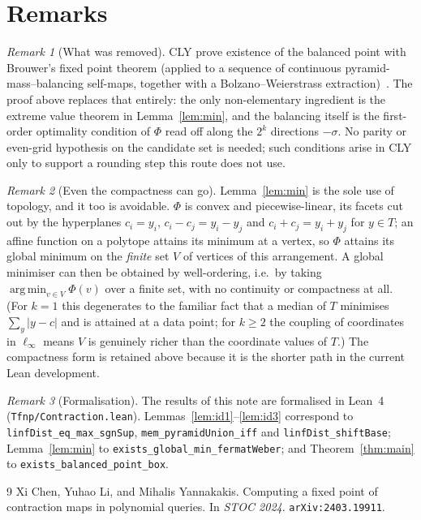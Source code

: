 \documentclass[11pt]{article}
\theoremstyle{plain}
\theoremstyle{definition}
\theoremstyle{remark}
\newtheorem{remark}{Remark}
\newcommand{\abs}[1]{\lvert #1 \rvert}
\newcommand{\sgn}{\sigma}
\newcommand{\FW}{\Phi}
\DeclareMathOperator*{\argmin}{arg\,min}
\begin{document}
\section{Remarks}

\begin{remark}[What was removed]
CLY prove existence of the balanced point with Brouwer's fixed point theorem
(applied to a sequence of continuous pyramid-mass--balancing self-maps, together
with a Bolzano--Weierstrass extraction)~\cite{CLY24}. The proof above replaces
that entirely: the only non-elementary ingredient is the extreme value theorem
in Lemma~\ref{lem:min}, and the balancing itself is the first-order optimality
condition of $\FW$ read off along the $2^k$ directions $-\sgn$. No parity or
even-grid hypothesis on the candidate set is needed; such conditions arise in
CLY only to support a rounding step this route does not use.
\end{remark}

\begin{remark}[Even the compactness can go]
Lemma~\ref{lem:min} is the sole use of topology, and it too is avoidable.
$\FW$ is convex and piecewise-linear, its facets cut out by the hyperplanes
$c_i=y_i$, $c_i-c_j=y_i-y_j$ and $c_i+c_j=y_i+y_j$ for $y\in T$; an affine
function on a polytope attains its minimum at a vertex, so $\FW$ attains its
global minimum on the \emph{finite} set $V$ of vertices of this arrangement.
A global minimiser can then be obtained by well-ordering, i.e.\ by taking
$\argmin_{v\in V}\FW(v)$ over a finite set, with no continuity or compactness at
all. (For $k=1$ this degenerates to the familiar fact that a median of $T$
minimises $\sum_{y}\abs{y-c}$ and is attained at a data point; for $k\ge 2$ the
coupling of coordinates in $\ell_\infty$ means $V$ is genuinely richer than the
coordinate values of $T$.) The compactness form is retained above because it is
the shorter path in the current Lean development.
\end{remark}

\begin{remark}[Formalisation]
The results of this note are formalised in Lean~4 (\texttt{Tfnp/Contraction.lean}).
Lemmas~\ref{lem:id1}--\ref{lem:id3} correspond to
\texttt{linfDist\_eq\_max\_sgnSup}, \texttt{mem\_pyramidUnion\_iff} and
\texttt{linfDist\_shiftBase}; Lemma~\ref{lem:min} to
\texttt{exists\_global\_min\_fermatWeber}; and Theorem~\ref{thm:main} to
\texttt{exists\_balanced\_point\_box}.
\end{remark}

\begin{thebibliography}{9}
Xi Chen, Yuhao Li, and Mihalis Yannakakis.
\newblock Computing a fixed point of contraction maps in polynomial queries.
\newblock In \emph{STOC 2024}. \texttt{arXiv:2403.19911}.
\end{thebibliography}
\end{document}
